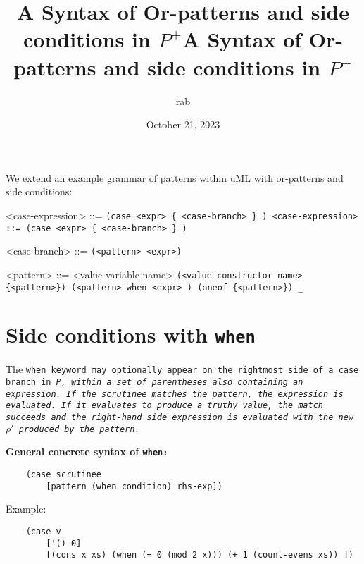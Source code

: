 \documentclass[]{article}
\title{A Syntax of Or-patterns and side conditions in $P^{+}$}
\title{A Syntax of Or-patterns and side conditions in $P^{+}$}
\author{rab}
\date{October 21, 2023}
\begin{document}
\maketitle


We extend an example grammar of patterns within uML with 
or-patterns and side conditions: 

\bigskip

\begin{grammar}
    <case-expression> ::= \tt{(case} <expr> \{ <case-branch> \} \tt{)}
    <case-expression> ::= \tt{(case} <expr> \{ <case-branch> \} \tt{)}
    
    <case-branch> ::= \tt{(}<pattern> <expr>\tt{)}
    
    <pattern> ::= <value-variable-name>
    \alt \tt{(}<value-constructor-name> \{<pattern>\}\tt{)}
    \alt \tt{(}<pattern> \tt{when} <expr> \tt{)} 
    \alt \tt{(oneof} \{<pattern>\}\tt{)}
    \alt \tt{_}
    
\end{grammar}

\bigskip

\section{Side conditions with \tt{when}}

The \tt{when} keyword may optionally appear on the rightmost side of a \tt{case}
branch in \it{P}, within a set of parentheses also containing an expression.
If the scrutinee matches the pattern, the expression is evaluated. If it 
evaluates to produce a truthy value, the match succeeds and the right-hand
side expression is evaluated with the new $\rho'$ produced by the pattern.

\medskip

\bf{General concrete syntax of \tt{when}: }

\begin{verbatim}
    (case scrutinee
        [pattern (when condition) rhs-exp])
\end{verbatim}


Example: 
\begin{verbatim}
    (case v
        ['() 0]
        [(cons x xs) (when (= 0 (mod 2 x))) (+ 1 (count-evens xs)) ])
\end{verbatim}


\end{document}
